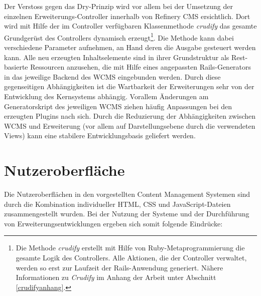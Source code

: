 Der Verstoss gegen das Dry-Prinzip wird vor allem bei der Umsetzung der einzelnen Erweiterungs-Controller innerhalb von Refinery CMS ersichtlich. Dort wird mit Hilfe der im Controller verfügbaren Klassenmethode \emph{crudify} das gesamte Grundgerüst des Controllers dynamisch erzeugt\footnote{Die Methode \emph{crudify} erstellt mit Hilfe von Ruby-Metaprogrammierung die gesamte Logik des Controllers. Alle Aktionen, die der Controller verwaltet, werden so erst zur Laufzeit der Rails-Anwendung generiert. Nähere Informationen zu \emph{Crudify} im Anhang der Arbeit unter Abschnitt \ref{crudifyanhang}.}. Die Methode kann dabei verschiedene Parameter aufnehmen, an Hand deren die Ausgabe gesteuert werden kann. Alle neu erzeugten Inhaltselemente sind in ihrer Grundstruktur als Rest-basierte Ressourcen anzusehen, die mit Hilfe eines angepassten Rails-Generators in das jeweilige Backend des WCMS eingebunden werden. Durch diese gegenseitigen Abhängigkeiten ist die Wartbarkeit der Erweiterungen sehr von der Entwicklung des Kernsystems abhängig. Vorallem Änderungen am Generatorskript des jeweiligen WCMS ziehen häufig Anpassungen bei den erzeugten Plugins nach sich. Durch die Reduzierung der Abhängigkeiten zwischen WCMS und Erweiterung (vor allem auf Darstellungsebene durch die verwendeten Views) kann eine stabilere Entwicklungsbasis geliefert werden.




\section{Nutzeroberfläche}

Die Nutzeroberflächen in den vorgestellten Content Management Systemen sind durch die Kombination individueller HTML, CSS und JavaScript-Dateien zusammengestellt wurden. Bei der Nutzung der Systeme und der Durchführung von Erweiterungsentwicklungen ergeben sich somit folgende Eindrücke:

